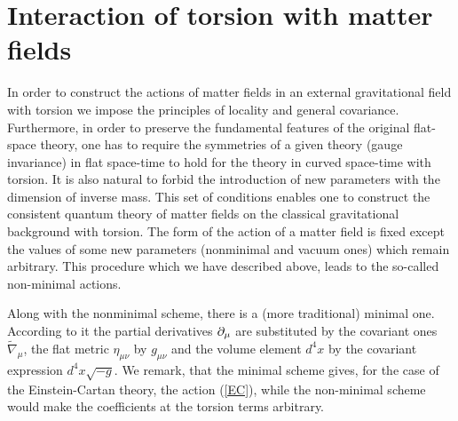 \section{Interaction of torsion with matter fields}

In order to construct the actions of matter fields in an external
gravitational field with torsion we impose the principles of 
locality and general covariance. Furthermore, in order to preserve 
the fundamental features of the original flat-space theory, 
one has to require the symmetries of a given theory (gauge 
invariance) in flat space-time to hold for the theory in curved 
space-time with torsion. It is also natural to forbid the 
introduction of new parameters with the dimension of inverse 
mass. This set of conditions enables one to construct the 
consistent quantum theory of matter fields on the classical 
gravitational background with torsion. The form of the action
of a matter field is fixed except the values of some new 
parameters (nonminimal and vacuum ones) which remain arbitrary. 
This procedure which we have described above, leads to the 
so-called non-minimal actions.

Along with the nonminimal scheme,
there is a (more traditional) minimal one. According to it
the partial derivatives $\partial_\mu$ are substituted by the
covariant ones $\tilde{\nabla}_\mu$, the flat
metric $\eta_{\mu\nu}$ by $g_{\mu\nu}$ and the
volume element $d^4x$ by the covariant expression $d^4x\sqrt{-g}$.
We remark, that the minimal scheme gives, for the case of 
the Einstein-Cartan theory, the action (\ref{EC}), 
while the non-minimal scheme would make the coefficients 
at the torsion terms arbitrary. 

